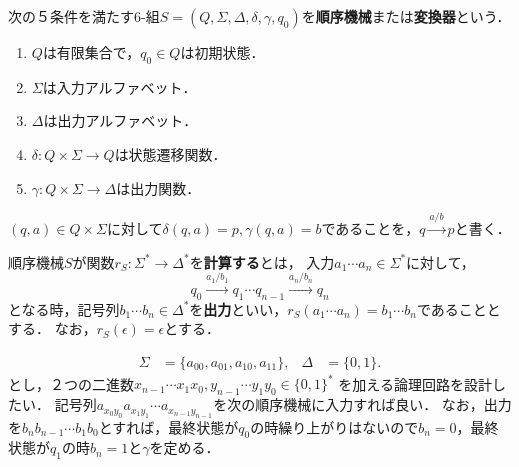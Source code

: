 \begin{definition}
    次の５条件を満たす6-組$S=(Q,\Sigma,\Delta,\delta,\gamma,q_0)$を\textbf{順序機械}または\textbf{変換器}という．
    \begin{enumerate}
        \item $Q$は有限集合で，$q_0\in Q$は初期状態．
        \item $\Sigma$は入力アルファベット．
        \item $\Delta$は出力アルファベット．
        \item $\delta:Q\times\Sigma\to Q$は状態遷移関数．
        \item $\gamma:Q\times\Sigma\to\Delta$は出力関数．
    \end{enumerate}
    $(q,a)\in Q\times\Sigma$に対して$\delta(q,a)=p,\gamma(q,a)=b$であることを，$q\xrightarrow{a/b}p$と書く．
\end{definition}

\begin{definition}[順序機械が計算する関数]
    順序機械$S$が関数$r_S:\Sigma^*\to\Delta^*$を\textbf{計算する}とは，
    入力$a_1\cdots a_n\in\Sigma^*$に対して，
    \[q_0\xrightarrow{a_1/b_1}q_1\cdots q_{n-1}\xrightarrow{a_n/b_n}q_n\]
    となる時，記号列$b_1\cdots b_n\in\Delta^*$を\textbf{出力}といい，$r_S(a_1\cdots a_n)=b_1\cdots b_n$であることとする．
    なお，$r_S(\epsilon)=\epsilon$とする．
\end{definition}

\begin{example}
    \begin{align*}
        \Sigma&=\{a_{00},a_{01},a_{10},a_{11}\},&\Delta&=\{0,1\}.
    \end{align*}
    とし，２つの二進数$x_{n-1}\cdots x_1x_0,y_{n-1}\cdots y_1y_0\in\{0,1\}^*$
    を加える論理回路を設計したい．
    記号列$a_{x_0y_0}a_{x_1y_1}\cdots a_{x_{n-1}y_{n-1}}$を次の順序機械に入力すれば良い．
    なお，出力を$b_nb_{n-1}\cdots b_1b_0$とすれば，最終状態が$q_0$の時繰り上がりはないので$b_n=0$，最終状態が$q_1$の時$b_n=1$と$\gamma$を定める．
    \begin{center}\end{center}
\end{example}

